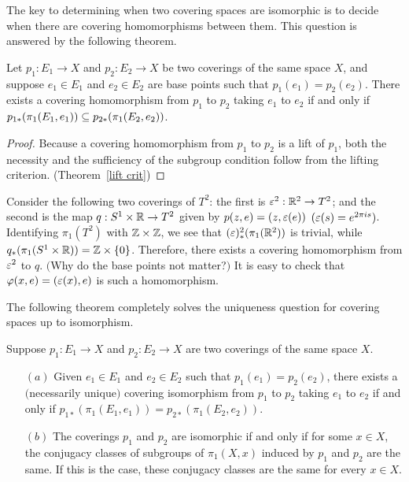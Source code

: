 The key to determining when two covering spaces are isomorphic is to decide when there are covering homomorphisms between them. This question is answered by the following theorem.
\begin{theorem}
Let $p_1:E_1\to X$ and $p_2:E_2\to X$ be two coverings of the same space $X$, and suppose $e_1\in E_1$ and $e_2\in E_2$ are base points such that $p_1(e_1)=p_2(e_2)$. There exists a covering homomorphism from $p_1$ to $p_2$ taking $e_1$ to $e_2$ if and only if $p_{1*}(\pi_1(E_1,e_1))\subseteq p_{2*}(\pi_1(E_2,e_2))$.
\end{theorem}
\begin{proof}
Because a covering homomorphism from $p_1$ to $p_2$ is a lift of $p_1$, both the necessity and the sufficiency of the subgroup condition follow from the lifting criterion. (Theorem~\ref{lift crit})
\end{proof}
\begin{example}
Consider the following two coverings of $T^2$: the first is $\varepsilon^2:\mathbb{R}^2\to T^2$; and
the second is the map $q:S^1\times\mathbb{R}\to T^2$ given by $p(z,e)=(z,\varepsilon(e))$ $(\varepsilon(s)=e^{2\pi is})$. Identifying $\pi_1(T^2)$ with $\mathbb{Z}\times\mathbb{Z}$, we see that $(\varepsilon)^2_*(\pi_1(\mathbb{R}^2))$ is trivial, while $q_*(\pi_1(S^1\times\mathbb{R}))=\mathbb{Z}\times\{0\}$. Therefore, there exists a covering homomorphism from $\varepsilon^2$ to $q$. $($Why do the base points not matter?$)$ It is easy to check that $\varphi(x,e)=(\varepsilon(x),e)$ is such a homomorphism.
\end{example}
The following theorem completely solves the uniqueness question for covering
spaces up to isomorphism.
\begin{theorem}\label{cover iso crit}
Suppose $p_1:E_1\to X$ and $p_2:E_2\to X$ are two coverings of the same space $X$.
\begin{itemize}
\item[$(a)$] Given $e_1\in E_1$ and $e_2\in E_2$ such that $p_1(e_1)=p_2(e_2)$, there exists a $($necessarily unique$)$ covering isomorphism from $p_1$ to $p_2$ taking $e_1$ to $e_2$ if and only if $p_{1*}(\pi_1(E_1,e_1))=p_{2*}(\pi_1(E_2,e_2))$.
\item[$(b)$] The coverings $p_1$ and $p_2$ are isomorphic if and only if for some $x\in X$, the conjugacy classes of subgroups of $\pi_1(X,x)$ induced by $p_1$ and $p_2$ are the same. If this is the case, these conjugacy classes are the same for every $x\in X$.
\end{itemize}
\end{theorem}
